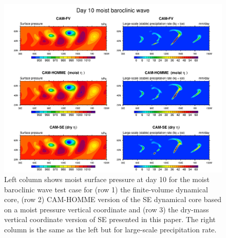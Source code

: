 \documentclass{agujournal}
\begin{document}
{\begin{figure}[h]
\centering
\includegraphics[width=33pc]{figs/02_baro_wave.pdf}
\caption{Left column shows moist surface pressure at day 10 for the moist baroclinic wave test case for (row 1) the finite-volume dynamical core, (row 2) CAM-HOMME version of the SE dynamical core based on a moist pressure vertical coordinate and (row 3) the dry-mass vertical coordinate version of SE presented in this paper. The right column is the same as the left but for large-scale precipitation rate.}
\label{fig:baro_wave}
\end{figure}

}
\end{document}
